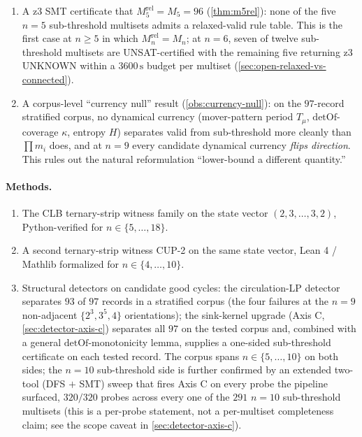 \documentclass[11pt,a4paper]{article}
\theoremstyle{plain}
\theoremstyle{definition}
\newcommand{\Mn}{M_n}
\newcommand{\detOf}{\mathrm{detOf}}
\begin{document}
\begin{enumerate}[leftmargin=*]
lower-bound evidence past $n = 11$ is extrapolation from
corpus-level detector separation on $n \in \{5, \ldots, 10\}$ and
the two full-layer sweeps at $n = 10, 11$.  If
the conjecture is true it forces $\Mn^{1/n} \to 3$ and would
resolve a connected-model variant of Knuth's 1985 asymptotic
questions (\cref{cor:asymptotic}); the unqualified 1985 questions
were posed under the relaxed-connectedness convention and their
resolution requires additional transport results
(\cref{sec:open-relaxed-vs-connected}).
\item A z3 SMT certificate that $M_5^{\mathrm{rel}} = M_5 = 96$
(\cref{thm:m5rel}): none of the five $n = 5$ sub-threshold
multisets admits a relaxed-valid rule table.  This is the first
case at $n \ge 5$ in which $M_n^{\mathrm{rel}} = M_n$; at $n = 6$,
seven of twelve sub-threshold multisets are UNSAT-certified with
the remaining five returning z3 UNKNOWN within a $3600\,\mathrm{s}$
budget per multiset
(\cref{sec:open-relaxed-vs-connected}).
\item A corpus-level ``currency null'' result
(\cref{obs:currency-null}): on the $97$-record stratified corpus,
no dynamical currency (mover-pattern period $T_\mu$,
$\detOf$-coverage $\kappa$, entropy $H$) separates valid from
sub-threshold more cleanly than $\prod m_i$ does, and at $n = 9$
every candidate dynamical currency \emph{flips direction}.  This
rules out the natural reformulation ``lower-bound a different
quantity.''
\end{enumerate}

\paragraph{Methods.}
\begin{enumerate}[leftmargin=*,resume]
\item The CLB ternary-strip witness family on the state vector
$(2, 3, \ldots, 3, 2)$, Python-verified for $n \in \{5, \ldots, 18\}$.
\item A second ternary-strip witness CUP-2 on the same state
vector, Lean 4 / Mathlib formalized for $n \in \{4, \ldots, 10\}$.
\item Structural detectors on candidate good cycles: the
circulation-LP detector separates $93$ of $97$ records in a
stratified corpus (the four failures at the $n = 9$ non-adjacent
$\{2^3, 3^5, 4\}$ orientations); the sink-kernel upgrade (Axis C,
\cref{sec:detector-axis-c}) separates all $97$ on the tested
corpus and, combined with a general $\detOf$-monotonicity lemma,
supplies a one-sided sub-threshold certificate on each tested
record.  The corpus spans $n \in \{5, \ldots, 10\}$ on both
sides; the $n = 10$ sub-threshold side is further confirmed by an
extended two-tool (DFS $+$ SMT) sweep that fires Axis C on every
probe the pipeline surfaced, $320 / 320$ probes across every one
of the $291$ $n = 10$ sub-threshold multisets (this is a per-probe
statement, not a per-multiset completeness claim; see the scope
caveat in \cref{sec:detector-axis-c}).
\end{enumerate}
\end{document}
